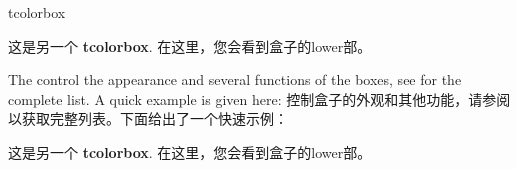 \begin{docEnvironment}{tcolorbox}{}
\begin{tcolorbox}
这是另一个 \textbf{tcolorbox}.
\tcblower
在这里，您会看到盒子的lower部。
\end{tcolorbox}

\begin{stripedbox}
The  control the appearance and several functions of the boxes,
see  for the complete list.
A quick example is given here:
\tcblower
{}控制盒子的外观和其他功能，请参阅  以获取完整列表。下面给出了一个快速示例：
\end{stripedbox}

\begin{dispExample}
\begin{tcolorbox}[colback=red!5!white,colframe=red!75!black,title=My nice heading]
  这是另一个 \textbf{tcolorbox}.
\tcblower
在这里，您会看到盒子的lower部。
\end{tcolorbox}
\end{dispExample}
\end{docEnvironment}